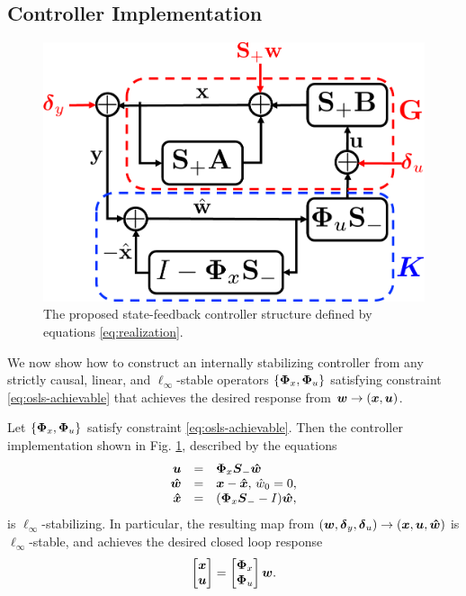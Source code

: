 \subsection{Controller Implementation}
\begin{figure}
\centering
\includegraphics[width=.4\textwidth]{interconnect}
\caption{The proposed state-feedback controller structure defined by equations \eqref{eq:realization}.}
\label{fig:realization}
\end{figure}
We now show how to construct an internally stabilizing controller from any strictly causal, linear, and $\ell_\infty$-stable operators $\left \{\boldsymbol{\Phi}_x,\boldsymbol{\Phi}_u\right\}$ satisfying constraint \eqref{eq:osls-achievable} that achieves the desired response from $\boldsymbol{w} \to (\boldsymbol{x}, \boldsymbol{u})$.
\begin{proposition}\label{prop:sufficiency}
Let $\left\{\boldsymbol{\Phi}_x,\boldsymbol{\Phi}_u\right\}$ satisfy constraint \eqref{eq:osls-achievable}.  Then the controller implementation shown in Fig. \ref{fig:realization}, described by the equations
\begin{equation}
\begin{array}{rcl}
\boldsymbol{u} &=& \boldsymbol{\Phi}_x \boldsymbol{S}_- \boldsymbol{\hat w}\\
\boldsymbol{\hat w} & = & \boldsymbol{x} - \boldsymbol{\hat x}, \, \hat{w}_0 = 0, \\
\boldsymbol{\hat x} &=& (\boldsymbol{\Phi}_x\boldsymbol{S}_--I)\boldsymbol{\hat w},
\end{array}
\label{eq:realization}
\end{equation}
is $\ell_\infty$-stabilizing.  In particular, the resulting map from $(\boldsymbol{w}, \boldsymbol{\delta}_y, \boldsymbol{\delta}_u) \to (\boldsymbol{x}, \boldsymbol{u}, \boldsymbol{\hat w})$ is $\ell_\infty$-stable, and achieves the desired closed loop response
\begin{equation}
\begin{bmatrix} \boldsymbol{x} \\ \boldsymbol{u} \end{bmatrix} = \begin{bmatrix} \boldsymbol{\Phi}_x \\ \boldsymbol{\Phi}_u \end{bmatrix}\boldsymbol{w}.
\label{eq:response}
\end{equation}
\end{proposition}

